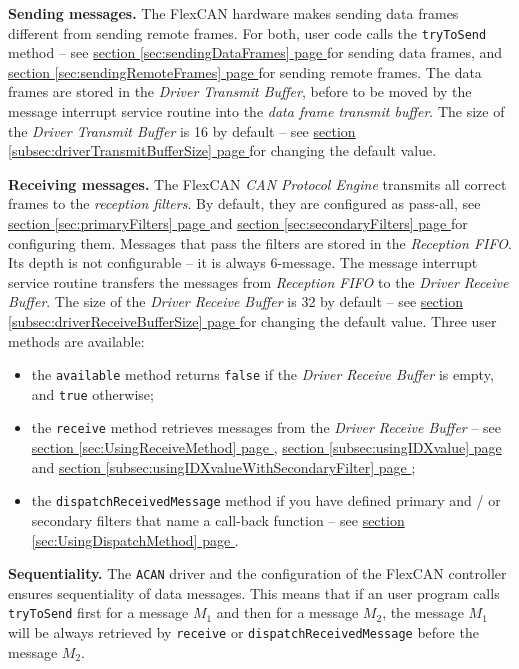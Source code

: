\documentclass[9pt, a4paper, obeyspaces, openany]{extarticle}
\newcommand\refSectionPage[1]{\hyperref[sec:#1]{section \ref*{sec:#1} page \pageref{sec:#1}}}
\newcommand\refSubsectionPage[1]{\hyperref[subsec:#1]{section \ref*{subsec:#1} page \pageref{subsec:#1}}}
\begin{document}
{\bf Sending messages.} The FlexCAN hardware makes sending data frames different from sending remote frames. For both, user code calls the \texttt{tryToSend} method -- see \refSectionPage{sendingDataFrames} for sending data frames, and \refSectionPage{sendingRemoteFrames} for sending remote frames. The data frames are stored in the \emph{Driver Transmit Buffer}, before to be moved by the message interrupt service routine into the \emph{data frame transmit buffer}. The size of the \emph{Driver Transmit Buffer} is 16 by default -- see \refSubsectionPage{driverTransmitBufferSize} for changing the default value.


{\bf Receiving messages.} The FlexCAN \emph{CAN Protocol Engine} transmits all correct frames to the \emph{reception filters}. By default, they are configured as pass-all, see \refSectionPage{primaryFilters} and  \refSectionPage{secondaryFilters} for configuring them. Messages that pass the filters are stored in the \emph{Reception FIFO}. Its depth is not configurable -- it is always 6-message. The message interrupt service routine transfers the messages from \emph{Reception FIFO} to the \emph{Driver Receive Buffer}. The size of the \emph{Driver Receive Buffer} is 32 by default -- see \refSubsectionPage{driverReceiveBufferSize} for changing the default value. Three user methods are available:
\begin{itemize}
  \item the \texttt{available} method returns \texttt{false} if the \emph{Driver Receive Buffer} is empty, and \texttt{true} otherwise;
  \item the \texttt{receive} method retrieves messages from the \emph{Driver Receive Buffer} -- see \refSectionPage{UsingReceiveMethod}, \refSubsectionPage{usingIDXvalue} and \refSubsectionPage{usingIDXvalueWithSecondaryFilter};
  \item the \texttt{dispatchReceivedMessage} method if you have defined primary and / or secondary filters that name a call-back function -- see \refSectionPage{UsingDispatchMethod}.
\end{itemize}

{\bf Sequentiality.} The \texttt{ACAN} driver and the configuration of the FlexCAN controller ensures sequentiality of data messages. This means that if an user program calls \texttt{tryToSend} first for a message $M_1$ and then for a message $M_2$, the message $M_1$ will be always retrieved by \texttt{receive} or \texttt{dispatchReceivedMessage} before the message $M_2$.
\end{document}
